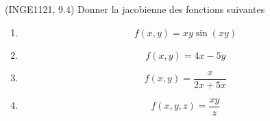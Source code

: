 
\begin{exercice}\label{exoFoncDeuxVar0022}

	(INGE1121, 9.4) Donner la jacobienne des fonctions suivantes
	\begin{enumerate}

		\item
			\begin{equation}
				f(x,y)=xy\sin(xy)
			\end{equation}
		\item
			\begin{equation}
				f(x,y)=4x-5y
			\end{equation}
		\item
			\begin{equation}
				f(x,y)=\frac{ x }{ 2x+5x }
			\end{equation}
		\item
			\begin{equation}
				f(x,y,z)=\frac{ xy }{ z }
			\end{equation}

	\end{enumerate}
	

\end{exercice}
